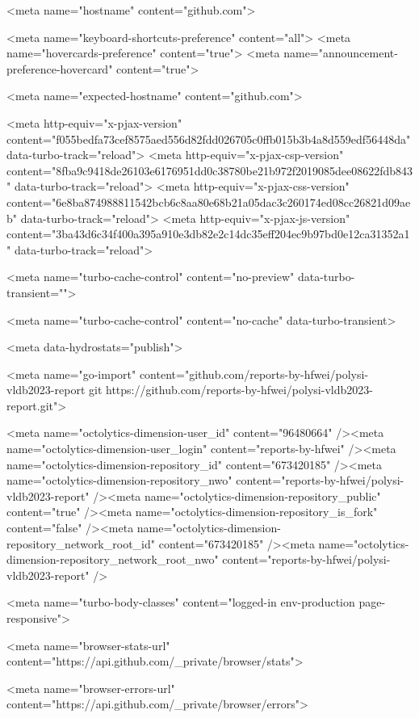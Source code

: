       <meta name="hostname" content="github.com">


      <meta name="keyboard-shortcuts-preference" content="all">
      <meta name="hovercards-preference" content="true">
      <meta name="announcement-preference-hovercard" content="true">

        <meta name="expected-hostname" content="github.com">


  <meta http-equiv="x-pjax-version" content="f055bedfa73cef8575aed556d82fdd026705c0ffb015b3b4a8d559edf56448da" data-turbo-track="reload">
  <meta http-equiv="x-pjax-csp-version" content="8fba9c9418de26103e6176951dd0c38780be21b972f2019085dee08622fdb843" data-turbo-track="reload">
  <meta http-equiv="x-pjax-css-version" content="6e8ba874988811542bcb6c8aa80e68b21a05dac3c260174ed08cc26821d09aeb" data-turbo-track="reload">
  <meta http-equiv="x-pjax-js-version" content="3ba43d6c34f400a395a910e3db82e2c14dc35eff204ec9b97bd0e12ca31352a1" data-turbo-track="reload">

  <meta name="turbo-cache-control" content="no-preview" data-turbo-transient="">

      <meta name="turbo-cache-control" content="no-cache" data-turbo-transient>

    <meta data-hydrostats="publish">

  <meta name="go-import" content="github.com/reports-by-hfwei/polysi-vldb2023-report git https://github.com/reports-by-hfwei/polysi-vldb2023-report.git">

  <meta name="octolytics-dimension-user_id" content="96480664" /><meta name="octolytics-dimension-user_login" content="reports-by-hfwei" /><meta name="octolytics-dimension-repository_id" content="673420185" /><meta name="octolytics-dimension-repository_nwo" content="reports-by-hfwei/polysi-vldb2023-report" /><meta name="octolytics-dimension-repository_public" content="true" /><meta name="octolytics-dimension-repository_is_fork" content="false" /><meta name="octolytics-dimension-repository_network_root_id" content="673420185" /><meta name="octolytics-dimension-repository_network_root_nwo" content="reports-by-hfwei/polysi-vldb2023-report" />



    

    <meta name="turbo-body-classes" content="logged-in env-production page-responsive">


  <meta name="browser-stats-url" content="https://api.github.com/_private/browser/stats">

  <meta name="browser-errors-url" content="https://api.github.com/_private/browser/errors">

